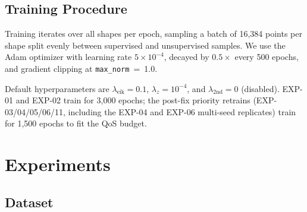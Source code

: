 \documentclass[conference]{IEEEtran}
\begin{document}
\subsection{Training Procedure}

Training iterates over all shapes per epoch, sampling a batch of 16{,}384 points per shape split evenly between supervised and unsupervised samples. We use the Adam optimizer with learning rate $5 \times 10^{-4}$, decayed by $0.5\times$ every 500 epochs, and gradient clipping at \texttt{max\_norm}~=~1.0.

Default hyperparameters are $\lambda_{\text{eik}} = 0.1$, $\lambda_z = 10^{-4}$, and $\lambda_{\text{2nd}} = 0$ (disabled). EXP-01 and EXP-02 train for 3{,}000 epochs; the post-fix priority retrains (EXP-03/04/05/06/11, including the EXP-04 and EXP-06 multi-seed replicates) train for 1{,}500 epochs to fit the QoS budget.

\section{Experiments}

\subsection{Dataset}
\label{sec:dataset}
\end{document}
